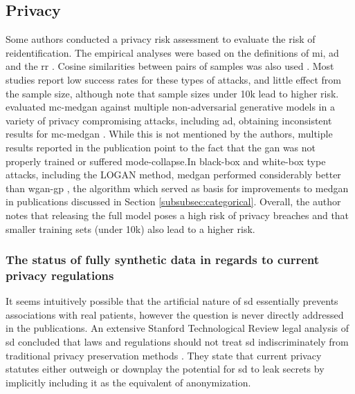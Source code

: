     \subsection{Privacy}
        Some authors conducted a privacy risk assessment to evaluate the risk of reidentification. The empirical analyses were based on the definitions of \gls{mi}, \gls{ad}  \cite{Choi2017-nt,Goncalves2020,yan2020generating,chen2019ganleaks, chincheong2020generation} and the \gls{rr} \cite{Zhang2020}. Cosine similarities between pairs of samples was also used \cite{torfi2019generating}. Most studies report low success rates for these types of attacks, and little effect from the sample size, although \citeauthor{chen2019ganleaks} note that sample sizes under 10k lead to higher risk. \citeauthor{Goncalves2020} evaluated \gls{mc-medgan} against multiple non-adversarial generative models in a variety of privacy compromising attacks, including \gls{ad}, obtaining inconsistent results for \gls{mc-medgan} \cite{Goncalves2020}. While this is not mentioned by the authors, multiple results reported in the publication point to the fact that the \gls{gan} was not properly trained or suffered mode-collapse.In black-box and white-box type attacks, including the LOGAN \cite{hayes2017logan} method, \gls{medgan} performed considerably better than \gls{wgan-gp} \cite{chen2019ganleaks}, the algorithm which served as basis for improvements to \gls{medgan} in publications discussed in Section \ref{subsubsec:categorical}. Overall, the author notes that releasing the full model poses a high risk of privacy breaches and that smaller training sets (under 10k) also lead to a higher risk. \par
        \subsubsection{The status of fully synthetic data in regards to current privacy regulations}
        
            It seems intuitively possible that the artificial nature of \gls{sd} essentially prevents associations with real patients, however the question is never directly addressed in the publications. An extensive Stanford Technological Review legal analysis of \gls{sd} concluded that laws and regulations should not treat \gls{sd} indiscriminately from traditional privacy preservation methods \cite{bellovin2019privacy}. They state that current privacy statutes either outweigh or downplay the potential for \gls{sd} to leak secrets by implicitly including it as the equivalent of anonymization. 
            
